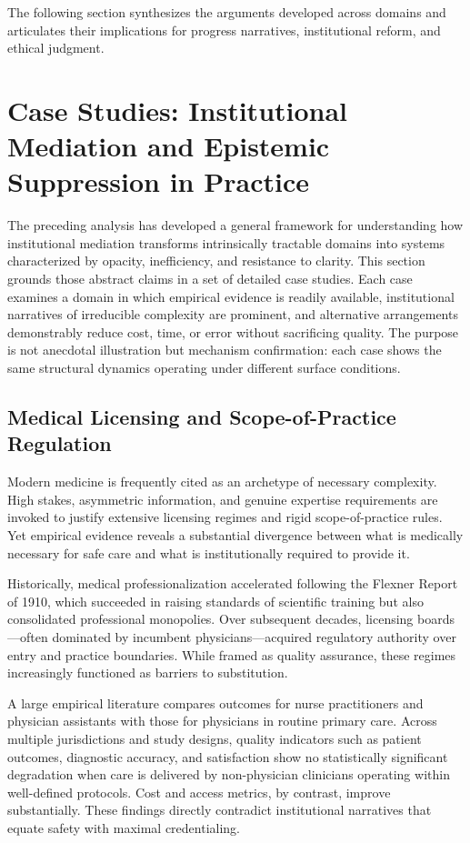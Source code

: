 \documentclass[11pt]{article}
\begin{document}
The following section synthesizes the arguments developed across domains and articulates their implications for progress narratives, institutional reform, and ethical judgment.

\section{Case Studies: Institutional Mediation and Epistemic Suppression in Practice}

The preceding analysis has developed a general framework for understanding how institutional mediation transforms intrinsically tractable domains into systems characterized by opacity, inefficiency, and resistance to clarity. This section grounds those abstract claims in a set of detailed case studies. Each case examines a domain in which empirical evidence is readily available, institutional narratives of irreducible complexity are prominent, and alternative arrangements demonstrably reduce cost, time, or error without sacrificing quality. The purpose is not anecdotal illustration but mechanism confirmation: each case shows the same structural dynamics operating under different surface conditions.

\subsection{Medical Licensing and Scope-of-Practice Regulation}

Modern medicine is frequently cited as an archetype of necessary complexity. High stakes, asymmetric information, and genuine expertise requirements are invoked to justify extensive licensing regimes and rigid scope-of-practice rules. Yet empirical evidence reveals a substantial divergence between what is medically necessary for safe care and what is institutionally required to provide it.

Historically, medical professionalization accelerated following the Flexner Report of 1910, which succeeded in raising standards of scientific training but also consolidated professional monopolies. Over subsequent decades, licensing boards—often dominated by incumbent physicians—acquired regulatory authority over entry and practice boundaries. While framed as quality assurance, these regimes increasingly functioned as barriers to substitution.

A large empirical literature compares outcomes for nurse practitioners and physician assistants with those for physicians in routine primary care. Across multiple jurisdictions and study designs, quality indicators such as patient outcomes, diagnostic accuracy, and satisfaction show no statistically significant degradation when care is delivered by non-physician clinicians operating within well-defined protocols. Cost and access metrics, by contrast, improve substantially. These findings directly contradict institutional narratives that equate safety with maximal credentialing.
\end{document}
